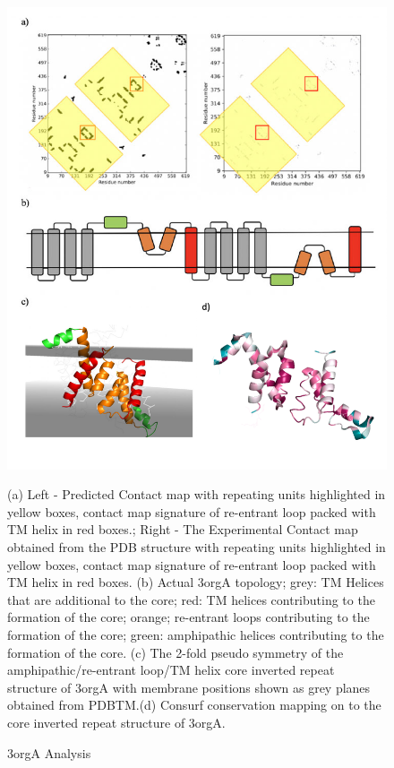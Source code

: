  \begin{figure}[th!]
    \centering
    \includegraphics[width=150mm, scale =0.75]{Results/fig7.png}
    \caption{3orgA Analysis}
    \label{fig:3org}
    \small
    (a) Left - Predicted Contact map with repeating units highlighted in yellow boxes, contact map signature of re-entrant loop packed with TM helix in red boxes.; Right - The Experimental Contact map obtained from the PDB structure with repeating units highlighted in yellow boxes, contact map signature of re-entrant loop packed with TM helix in red boxes. (b) Actual 3orgA topology; grey: TM Helices that are additional to the core; red: TM helices contributing to the formation of the core; orange; re-entrant loops contributing to the formation of the core; green: amphipathic helices contributing to the formation of the core. (c) The 2-fold pseudo symmetry of the amphipathic/re-entrant loop/TM helix core inverted repeat structure of 3orgA with membrane positions shown as grey planes obtained from PDBTM.(d) Consurf conservation mapping on to the core inverted repeat structure of 3orgA.
\end{figure}


